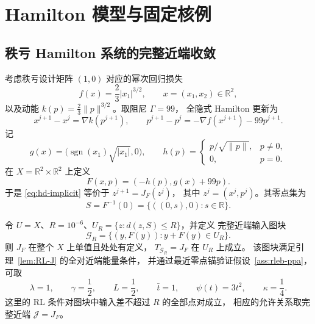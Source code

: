 \section{Hamilton 模型与固定核例}
\label{sec:rank-deficient-hamilton}

\subsection{秩亏 Hamilton 系统的完整近端收敛}

考虑秩亏设计矩阵 $(1,0)$ 对应的幂次回归损失
\[
 f(x)=\frac23|x_1|^{3/2},\qquad x=(x_1,x_2)\in\mathbb R^2,
\]
以及动能 $k(p)=\frac23\|p\|^{3/2}$。取阻尼 $\Gamma=99$，
全隐式 Hamilton 更新为
\begin{equation}
\label{eq:hd-implicit}
 x^{j+1}-x^j=\nabla k(p^{j+1}),\qquad
 p^{j+1}-p^j=-\nabla f(x^{j+1})-99p^{j+1}.
\end{equation}
记
\[
 g(x)=\bigl(\operatorname{sgn}(x_1)\sqrt{|x_1|},0\bigr),
 \qquad
 h(p)=\begin{cases}p/\sqrt{\|p\|},&p\ne0,\\0,&p=0.\end{cases}
\]
在 $X=\mathbb R^2\times\mathbb R^2$ 上定义
\[
 F(x,p)=(-h(p),g(x)+99p).
\]
于是 \eqref{eq:hd-implicit} 等价于 $z^{j+1}=J_F(z^j)$，
其中 $z^j=(x^j,p^j)$。其零点集为
\[
 S=F^{-1}(0)=\{((0,s),0):s\in\mathbb R\}.
\]

\begin{proposition}
\label{prop:rank-deficient-hamilton-rleb}
令 $U=X$、$R=10^{-6}$、$U_R=\{z:d(z,S)\leq R\}$，并定义
完整近端输入图块
\[
 \mathcal G_R=\{(y,F(y)):y+F(y)\in U_R\}.
\]
则 $J_F$ 在整个 $X$ 上单值且处处有定义，
$T_{\mathcal G_R}=J_F$ 在 $U_R$ 上成立。
该图块满足引理~\ref{lem:RL-J} 的全对近端能量条件，
并通过最近零点锚验证假设~\ref{ass:rleb-ppa}，可取
\[
 \lambda=1,\qquad \gamma=\frac12,\qquad L=\frac12,
 \qquad \bar t=1,\qquad \psi(t)=3t^2,
 \qquad \kappa=\frac14.
\]
这里的 RL 条件对图块中输入差不超过 $R$ 的全部点对成立，
相应的允许关系取完整近端 $\mathcal J=J_F$。
\end{proposition}

